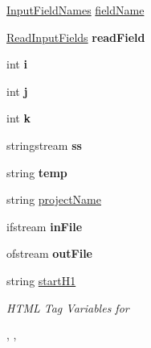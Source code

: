 \begin{DoxyCompactItemize}
\item 
\hyperlink{classInputFieldNames}{Input\-Field\-Names} \hyperlink{classDetail_a7da00e7f92734d799537ba843479a753}{field\-Name}
\item 
\hypertarget{classDetail_ad3bac86172e2f2411d8542ad28852b04}{\hyperlink{classReadInputFields}{Read\-Input\-Fields} {\bfseries read\-Field}}\label{classDetail_ad3bac86172e2f2411d8542ad28852b04}

\item 
\hypertarget{classDetail_aae34c0e6b31674c4057f3d5334b00195}{int {\bfseries i}}\label{classDetail_aae34c0e6b31674c4057f3d5334b00195}

\item 
\hypertarget{classDetail_ab3820e158ad73c35ad6d95aa65ce2602}{int {\bfseries j}}\label{classDetail_ab3820e158ad73c35ad6d95aa65ce2602}

\item 
\hypertarget{classDetail_a92b3047885960f0b8fc5b7f8ca28a31f}{int {\bfseries k}}\label{classDetail_a92b3047885960f0b8fc5b7f8ca28a31f}

\item 
\hypertarget{classDetail_af6585630e9045333be49e30c2b98011e}{stringstream {\bfseries ss}}\label{classDetail_af6585630e9045333be49e30c2b98011e}

\item 
\hypertarget{classDetail_a272f9895e99a24600af4cc00c71e3720}{string {\bfseries temp}}\label{classDetail_a272f9895e99a24600af4cc00c71e3720}

\item 
string \hyperlink{classPageLayout_a8a3c1ddc422df2556fbc95d0cd575a05}{project\-Name}
\item 
\hypertarget{classPageLayout_a9abec89a54a6f0dac84114919d2ad117}{ifstream {\bfseries in\-File}}\label{classPageLayout_a9abec89a54a6f0dac84114919d2ad117}

\item 
\hypertarget{classPageLayout_ad52913274f786e82e1e09f5df4bf5347}{ofstream {\bfseries out\-File}}\label{classPageLayout_ad52913274f786e82e1e09f5df4bf5347}

\item 
string \hyperlink{classHTMLTags_ae987289d0dab2e3e234048615f930d0f}{start\-H1}
\begin{DoxyCompactList}\small\item\em H\-T\-M\-L Tag Variables for 

, , 


\end{DoxyCompactList}
\end{DoxyCompactItemize}
